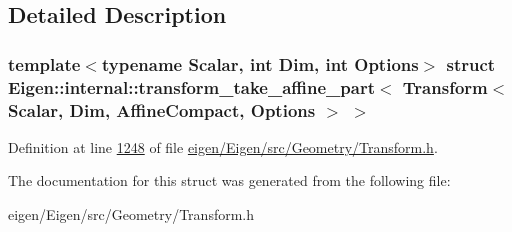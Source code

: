 \subsection{Detailed Description}
\subsubsection*{template$<$typename Scalar, int Dim, int Options$>$\newline
struct Eigen\+::internal\+::transform\+\_\+take\+\_\+affine\+\_\+part$<$ Transform$<$ Scalar, Dim, Affine\+Compact, Options $>$ $>$}



Definition at line \hyperlink{eigen_2_eigen_2src_2_geometry_2_transform_8h_source_l01248}{1248} of file \hyperlink{eigen_2_eigen_2src_2_geometry_2_transform_8h_source}{eigen/\+Eigen/src/\+Geometry/\+Transform.\+h}.



The documentation for this struct was generated from the following file\+:\begin{DoxyCompactItemize}
\item 
eigen/\+Eigen/src/\+Geometry/\+Transform.\+h\end{DoxyCompactItemize}
